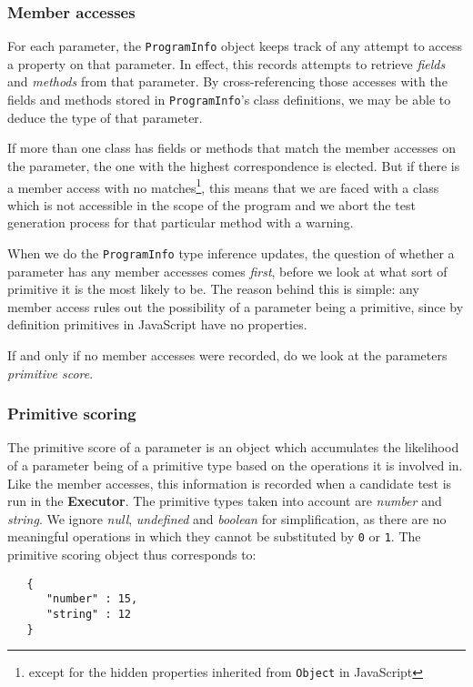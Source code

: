 \subsubsection{Member accesses}
For each parameter, the \texttt{ProgramInfo} object keeps track of any attempt to access a property on that parameter. In effect, this records attempts to retrieve \emph{fields} and \emph{methods} from that parameter. By cross-referencing those accesses with the fields and methods stored in \texttt{ProgramInfo}'s class definitions, we may be able to deduce the type of that parameter. 

If more than one class has fields or methods that match the member accesses on the parameter, the one with the highest correspondence is elected. But if there is a member access with no matches\footnote{except for the hidden properties inherited from \texttt{Object} in JavaScript}, this means that we are faced with a class which is not accessible in the scope of the program and we abort the test generation process for that particular method with a warning.

When we do the \texttt{ProgramInfo} type inference updates, the question of whether a parameter has any member accesses comes \emph{first}, before we look at what sort of primitive it is the most likely to be. The reason behind this is simple: any member access rules out the possibility of a parameter being a primitive, since by definition primitives in JavaScript have no properties.

If and only if no member accesses were recorded, do we look at the parameters \emph{primitive score}.

\subsubsection{Primitive scoring}
The primitive score of a parameter is an object which accumulates the likelihood of a parameter being of a primitive type based on the operations it is involved in. Like the member accesses, this information is recorded when a candidate test is run in the \textbf{Executor}. The primitive types taken into account are \emph{number} and \emph{string}. We ignore \emph{null}, \emph{undefined} and \emph{boolean} for simplification, as there are no meaningful operations in which they cannot be substituted by \texttt{0} or \texttt{1}. The primitive scoring object thus corresponds to:

\begin{lstlisting}
   {
      "number" : 15,
      "string" : 12
   }
\end{lstlisting}

